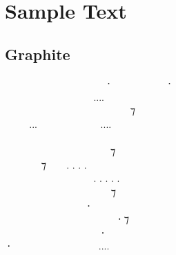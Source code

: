 \documentclass[11pt,a4paper]{article}
\begin{document}
\formalAATswash 


\newpage

\section{Sample Text}

\subsection{Graphite}
\formalGR
  ‍   ⸱‍  ‍ ⸱ \\
    ‍....  ‍  \\
  ‍   ‍ ‍ ⁊ ‍  \\
...  ....   \\
         ‍ \\
 ‍ ‍‍   ⁊  ‍ ‍ \\
 ‍ ⁊  . . . .  ‍ ‍‍   \\
   ‍ . . . . . ‍ ‍   \\
      ⁊    \\
   ‍⸱‍   ‍  \\
     ‍⸱ ⁊  ‍ \\
    ⸱    \\
⸱  ‍  .... ‍‍    \\
\end{document}
